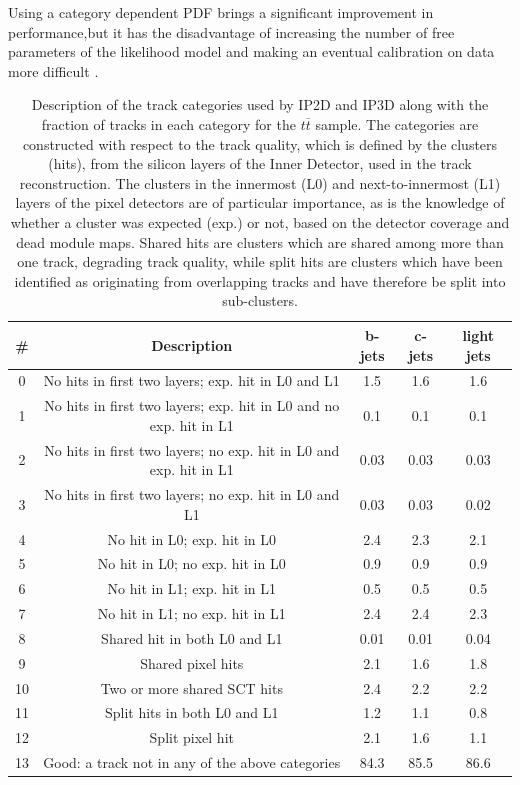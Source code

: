Using a category dependent PDF brings a significant improvement in performance,but it has the disadvantage of increasing the number of free parameters of the likelihood model and making an eventual calibration on data more difficult \cite{Giac_44}.
\begin{table}
\begin{center}
\begin{tabular}{|c|c|c|c|c|}
\hline
\# & Description & b-jets & c-jets & light jets\\
\hline
0 & No hits in first two layers; exp. hit in L0 and L1 & 1.5 & 1.6 & 1.6\\
1 & No hits in first two layers; exp. hit in L0 and no exp. hit in L1 & 0.1 & 0.1 & 0.1\\
2 & No hits in first two layers; no exp. hit in L0 and exp. hit in L1 & 0.03 & 0.03 & 0.03\\
3 & No hits in first two layers; no exp. hit in L0 and L1 & 0.03 & 0.03 & 0.02\\
4 & No hit in L0; exp. hit in L0 & 2.4 & 2.3 & 2.1\\
5 & No hit in L0; no exp. hit in L0 & 0.9 & 0.9 & 0.9\\
6 & No hit in L1; exp. hit in L1 & 0.5 & 0.5 & 0.5\\
7 & No hit in L1; no exp. hit in L1 & 2.4 & 2.4 & 2.3\\
8 & Shared hit in both L0 and L1 & 0.01 & 0.01 & 0.04\\
9 & Shared pixel hits & 2.1 & 1.6 & 1.8\\
10 & Two or more shared SCT hits & 2.4 & 2.2 & 2.2\\
11 & Split hits in both L0 and L1 & 1.2 & 1.1 & 0.8\\
12 & Split pixel hit & 2.1 & 1.6 & 1.1\\
13 & Good: a track not in any of the above categories & 84.3 & 85.5 & 86.6\\
\hline
\end{tabular}
\caption{Description of the track categories used by IP2D and IP3D along with the fraction of tracks
in each category for the $t\overline{t}$ sample. The categories are constructed with respect to the track quality,
which is defined by the clusters (hits), from the silicon layers of the Inner Detector, used in the track
reconstruction. The clusters in the innermost (L0) and next-to-innermost (L1) layers of the pixel detectors
are of particular importance, as is the knowledge of whether a cluster was expected (exp.) or not,
based on the detector coverage and dead module maps. Shared hits are clusters which are shared among
more than one track, degrading track quality, while split hits are clusters which have been identified as
originating from overlapping tracks and have therefore be split into sub-clusters.}
\label{tab:track_cat}
\end{center}
\end{table}
